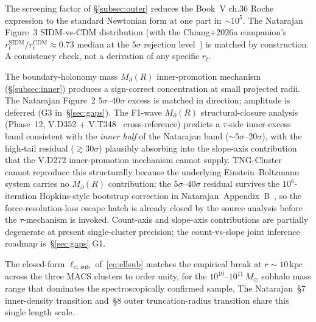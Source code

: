 \documentclass{pantarhei-researchnote}
\newcommand{\ellsub}{\ell_{\mathrm{cl},\mathrm{sub}}}  %
\newcommand{\Mpa}{M_{\partial}}                 %
\newcommand{\Rtwohun}{R_{200}}
\newcommand{\kpc}{\mathrm{kpc}}
\newcommand{\Msun}{M_{\odot}}
\newcommand{\rtran}{r_{\mathrm{trans}}}
\begin{document}
\begin{description}[leftmargin=1.7em,itemsep=0.4em]
\item[\S{}4.1 Outer $r_t$ at $10$--$100\,\kpc$.]
The screening factor of \S\ref{subsec:outer} reduces the Book~V ch.36 Roche
expression to the standard Newtonian form at one part in $\sim 10^{5}$.
The Natarajan Figure~3 SIDM-vs-CDM distribution (with the Chiang+2026a
companion's $r_t^{\mathrm{SIDM}}/r_t^{\mathrm{CDM}} \approx 0.73$ median
at the $5\sigma$ rejection level~\cite{ChiangTNGC2026}) is matched by
construction. A consistency check, not a derivation of any specific $r_t$.

\item[\S{}4.2 Inner member-number excess at $R/\Rtwohun \lesssim 0.2$.]
The boundary-holonomy mass $\Mpa(R)$ inner-promotion mechanism
(\S\ref{subsec:inner}) produces a sign-correct concentration at small
projected radii. The Natarajan Figure~2 $5\sigma$--$40\sigma$ excess is
matched in direction; amplitude is deferred (G3 in~\S\ref{sec:gaps}).
The F1-wave $\Mpa(R)$ structural-closure analysis (Phase~12, V.D352 +
V.T348~\cite{Natarajan2026} cross-reference) predicts a $\tau$-side
inner-excess band consistent with the \emph{inner half} of the Natarajan
band ($\sim 5\sigma$--$20\sigma$), with the high-tail residual
($\gtrsim 30\sigma$) plausibly absorbing into the slope-axis
contribution that the V.D272 inner-promotion mechanism cannot supply.
TNG-Cluster~\cite{NelsonTNGC2024} cannot reproduce this structurally
because the underlying Einstein--Boltzmann system carries no
$\Mpa(R)$ contribution; the $5\sigma$--$40\sigma$ residual survives
the $10^6$-iteration Hopkins-style bootstrap correction in
Natarajan~Appendix~B~\cite{Natarajan2026,Hopkins2023}, so the
force-resolution-loss escape hatch is already closed by the source
analysis before the $\tau$-mechanism is invoked. Count-axis and
slope-axis contributions are partially degenerate at present
single-cluster precision; the count-vs-slope joint inference roadmap
is~\S\ref{sec:gaps} G1.

\item[\S{}4.3 Transition scale $\rtran \approx 3.4$--$10.8\,\kpc$.]
The closed-form $\ellsub$ of~\eqref{eq:ellsub} matches the empirical break
at $r \sim 10\,\kpc$ across the three MACS clusters to order unity, for
the $10^{10}$--$10^{11}\,\Msun$ subhalo mass range that dominates the
spectroscopically confirmed sample. The Natarajan~\S{}7 inner-density
transition and~\S{}8 outer truncation-radius transition share this
single length scale.
\end{description}
\end{document}

